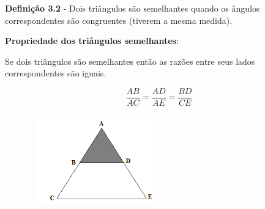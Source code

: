 \begin{caixa}
\textbf{Definição 3.2} - Dois triângulos são semelhantes quando os ângulos correspondentes são congruentes (tiverem a mesma medida).
\end{caixa}

\begin{caixa}
\textbf{Propriedade dos triângulos semelhantes}:
\begin{multicols}{2}

Se dois triângulos são semelhantes então as razões entre seus lados correspondentes são iguais.

 \[ \frac{AB}{AC}=\frac{AD}{AE}=\frac{BD}{CE} \]

\end{multicols}
\begin{figure}[H]
    \begin{Center}
        \includegraphics[width=2.31in,height=1.53in]{capitulos/trigonometria_e_funcoes_trigonometricas/media/image10.png}
    \end{Center}
\end{figure}
\end{caixa}

